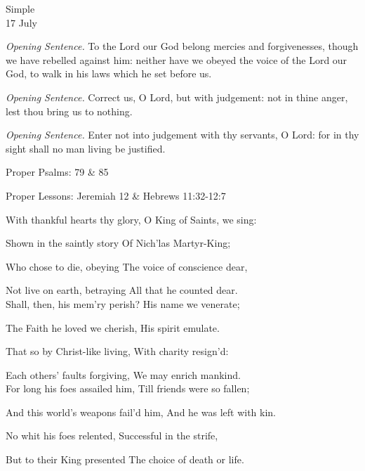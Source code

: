 \begin{inhead}
    {Simple\\
17 July}
\end{inhead}

\textit{Opening Sentence.} To the Lord our God belong mercies and forgivenesses, though we have rebelled against him: neither have we obeyed the voice of the Lord our God, to walk in his laws which he set before us.

\textit{Opening Sentence.} Correct us, O Lord, but with judgement: not in thine anger, lest thou bring us to nothing.

\textit{Opening Sentence.} Enter not into judgement with thy servants, O Lord: for in thy sight shall no man living be justified.


\begin{rubric}
	Proper Psalms: 79 \& 85
\end{rubric}
\begin{rubric}
	Proper Lessons: Jeremiah 12 \& Hebrews 11:32-12:7
\end{rubric}

With thankful hearts thy glory, O King of Saints, we sing:

Shown in the saintly story Of Nich'las Martyr-King;

Who chose to die, obeying The voice of conscience dear,

Not live on earth, betraying All that he counted dear.\\

Shall, then, his mem'ry perish? His name we venerate;

The Faith he loved we cherish, His spirit emulate.

That so by Christ-like living, With charity resign'd:

Each others' faults forgiving, We may enrich mankind.\\

For long his foes assailed him, Till friends were so fallen;

And this world's weapons fail'd him, And he was left with kin.

No whit his foes relented, Successful in the strife,

But to their King presented The choice of death or life.\\

